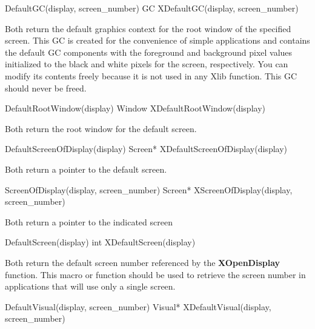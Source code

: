 \documentclass{report}
\begin{document}
\begin{itemize}
            \bigbreak \noindent 
            \begin{cppcode}
            DefaultGC(display, screen_number)
            GC XDefaultGC(display, screen_number)
            \end{cppcode}
            \bigbreak \noindent 
            Both return the default graphics context for the root window of the specified screen. This GC is created for the convenience of simple applications and contains the default GC components with the foreground and background pixel values initialized to the black and white pixels for the screen, respectively. You can modify its contents freely because it is not used in any Xlib function. This GC should never be freed.
            \bigbreak \noindent 
            \begin{cppcode}
            DefaultRootWindow(display)
            Window XDefaultRootWindow(display)
            \end{cppcode}
            \bigbreak \noindent 
            Both return the root window for the default screen.
            \bigbreak \noindent 
            \begin{cppcode}
            DefaultScreenOfDisplay(display)
            Screen* XDefaultScreenOfDisplay(display)
            \end{cppcode}
            \bigbreak \noindent 
            Both return a pointer to the default screen.
            \bigbreak \noindent 
            \begin{cppcode}
            ScreenOfDisplay(display, screen_number)
            Screen* XScreenOfDisplay(display, screen_number)
            \end{cppcode}
            \bigbreak \noindent 
            Both return a pointer to the indicated screen
            \bigbreak \noindent 
            \begin{cppcode}
            DefaultScreen(display)
            int XDefaultScreen(display)
            \end{cppcode}
            \bigbreak \noindent 
            Both return the default screen number referenced by the \textbf{XOpenDisplay} function. This macro or function should be used to retrieve the screen number in applications that will use only a single screen.
            \bigbreak \noindent 
            \begin{cppcode}
            DefaultVisual(display, screen_number)
            Visual* XDefaultVisual(display, screen_number)
            \end{cppcode}
            \bigbreak \noindent 

\end{itemize}
\end{document}
